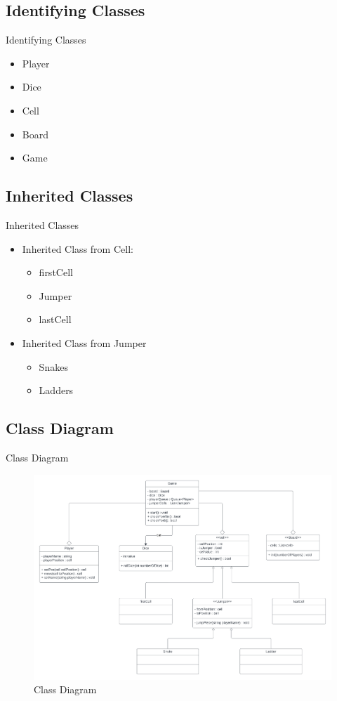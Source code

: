 \documentclass{beamer}
\begin{document}
\subsection{Identifying Classes}
\begin{frame}{Identifying Classes}
    \begin{itemize}
        \item Player
        \item Dice
        \item Cell
        \item Board
        \item Game
    \end{itemize}
\end{frame}
\subsection{Inherited Classes}
\begin{frame}{Inherited Classes}
    \begin{itemize}
        \item Inherited Class from Cell:
        \begin{itemize}
            \item firstCell
            \item Jumper
            \item lastCell
        \end{itemize}
        \item Inherited Class from Jumper
        \begin{itemize}
            \item Snakes
            \item Ladders
        \end{itemize}
    \end{itemize}
\end{frame}
\subsection{Class Diagram}
\begin{frame}{Class Diagram}
    \begin{figure}
        \centering
        \includegraphics[width = 0.9\linewidth]{UML diagrams.png}
        \caption{Class Diagram}
        \label{fig:enter-label}
    \end{figure}
\end{frame}
\end{document}
